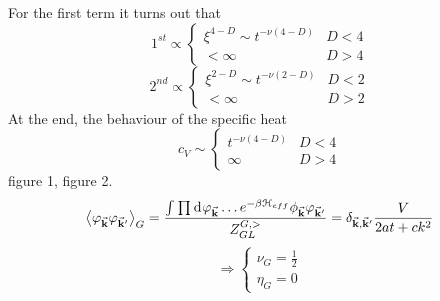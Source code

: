 \documentclass[../main/main.tex]{subfiles}
\begin{document}
For the first term it turns out that
\begin{equation}
1^{st} \propto
  \begin{cases}
   \xi ^{4-D} \sim t^{-\nu (4-D)}  & D < 4\\
  < \infty & D > 4
  \end{cases}
\end{equation}
\begin{equation}
2^{nd} \propto
  \begin{cases}
   \xi ^{2-D} \sim t^{-\nu (2-D)}  & D < 2\\
  < \infty & D > 2
  \end{cases}
\end{equation}
At the end, the behaviour of the specific heat
\begin{equation}
  c_V \sim \begin{cases}
    t^{-\nu (4-D)} & D < 4 \\
    \infty & D > 4
\end{cases}
\end{equation}
figure 1, figure 2.
\begin{equation}
  \expval{\varphi _{\va{k}} \varphi _{\va{k}'}}_G = \frac{\int_{}^{} \prod_{}^{}   \dd[]{\varphi _{\va{k}}}  \dots e^{- \beta \mathcal{H}_{eff}}  \phi_{\va{k}} \varphi _{\va{k}'} }{Z_{GL}^{G,>}}
  = \delta _{\va{k},\va{k}'} \frac{V}{2 a t + c k^2}
\end{equation}
\begin{equation}
\Rightarrow
  \begin{cases}
   \nu _G = \frac{1}{2}\\
   \eta_G = 0
  \end{cases}
\end{equation}
\end{document}
